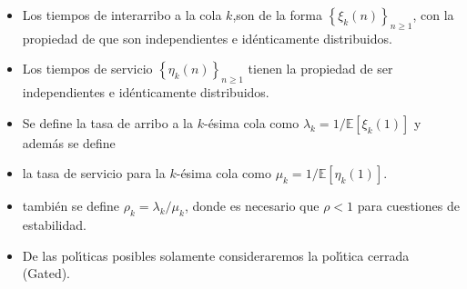 \documentclass{article}
\newcommand{\esp}{\mathbb{E}}
\begin{document}
\begin{itemize}
\item Los tiempos de interarribo a la cola $k$,son de la forma $\left\{\xi_{k}\left(n\right)\right\}_{n\geq1}$, con la propiedad de que son independientes e id{\'e}nticamente distribuidos.

\item Los tiempos de servicio $\left\{\eta_{k}\left(n\right)\right\}_{n\geq1}$ tienen la propiedad de ser independientes e id{\'e}nticamente distribuidos.

\item Se define la tasa de arribo a la $k$-{\'e}sima cola como $\lambda_{k}=1/\esp\left[\xi_{k}\left(1\right)\right]$ y adem{\'a}s se define

\item la tasa de servicio para la $k$-{\'e}sima cola como $\mu_{k}=1/\esp\left[\eta_{k}\left(1\right)\right]$.

\item tambi{\'e}n se define $\rho_{k}=\lambda_{k}/\mu_{k}$, donde es necesario que $\rho<1$ para cuestiones de estabilidad.

\item De las pol{\'\i}ticas posibles solamente consideraremos la pol{\'\i}tica cerrada (Gated).
\end{itemize}
\end{document}

